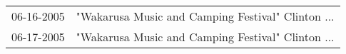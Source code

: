 \begin{supertabular}{ll}
 06-16-2005 &  "Wakarusa Music and Camping Festival" Clinton ... \\
 06-17-2005 &  "Wakarusa Music and Camping Festival" Clinton ... \\
\end{supertabular}
